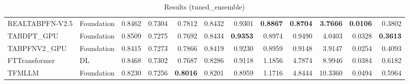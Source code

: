 \begin{table}[htbp]
{\begin{tabular}{ll|rrrrrrrrrr}
REALTABPFN-V2.5 & Foundation & 0.8462 & 0.7304 & 0.7812 & 0.8432 & 0.9301 & \textbf{0.8867} & \textbf{0.8704} & \textbf{3.7666} & \textbf{0.0106} & 0.3802 \\
TABDPT\_GPU & Foundation & 0.8509 & 0.7275 & 0.7692 & 0.8434 & \textbf{0.9353} & 0.8974 & 0.9490 & 4.0403 & 0.0328 & \textbf{0.3613} \\
TABPFNV2\_GPU & Foundation & 0.8415 & 0.7273 & 0.7866 & 0.8419 & 0.9230 & 0.8959 & 0.9148 & 3.9147 & 0.0254 & 0.4093 \\
\midrule
FTTransformer & DL & 0.8468 & 0.7302 & 0.7687 & 0.8286 & 0.9118 & 1.1856 & 4.7874 & 8.9946 & 0.0384 & 0.6182 \\
TFMLLM & Foundation & 0.8230 & 0.7256 & \textbf{0.8016} & 0.8201 & 0.8959 & 1.1716 & 4.8444 & 10.3360 & 0.0494 & 0.5964 \\
\bottomrule
\end{tabular}
}
\caption{Results (tuned_ensemble)}
\label{tab:results_tuned_ensemble}
\end{table}